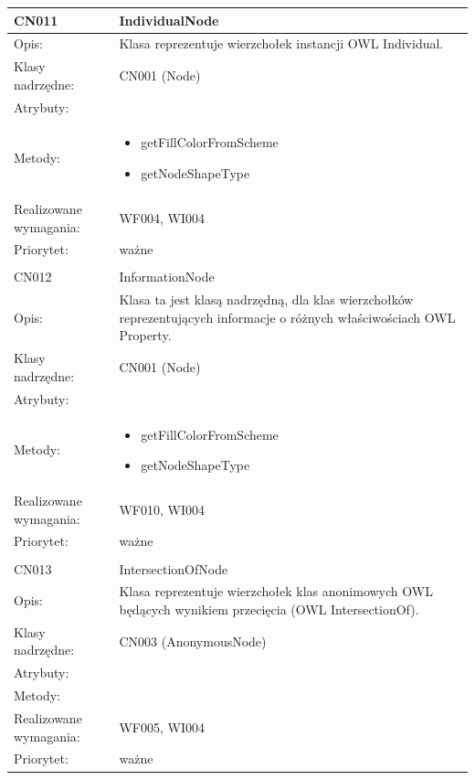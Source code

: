 \documentclass[a4paper,10pt]{article}
\begin{document}
\begin{center}
\begin{longtable}{|m{3cm}|m{9cm}|}
CN011 & IndividualNode \\ \hline
Opis: & Klasa reprezentuje wierzchołek instancji OWL Individual.  \\ \hline
Klasy nadrzędne: & CN001 (Node)       \\ \hline
Atrybuty: & %
 \\ \hline
Metody: & \begin{itemize}
 \item getFillColorFromScheme
 \item getNodeShapeType
\end{itemize}
  \\ \hline
Realizowane wymagania: & WF004, WI004 \\ \hline
Priorytet: & ważne  \\ \hline

\multicolumn{2}{c}{} \\
 \hline

CN012 & InformationNode \\ \hline
Opis: & Klasa ta jest klasą nadrzędną, dla klas wierzchołków reprezentujących informacje o różnych właściwościach OWL Property.    \\ \hline
Klasy nadrzędne: & CN001 (Node)       \\ \hline
Atrybuty: & %
 \\ \hline
Metody: & \begin{itemize}
 \item getFillColorFromScheme
 \item getNodeShapeType
\end{itemize}
  \\ \hline
Realizowane wymagania: & WF010, WI004 \\ \hline
Priorytet: & ważne  \\ \hline

\multicolumn{2}{c}{} \\
 \hline

CN013 & IntersectionOfNode \\ \hline
Opis: & Klasa reprezentuje wierzchołek klas anonimowych OWL będących wynikiem przecięcia (OWL IntersectionOf).    \\ \hline
Klasy nadrzędne: & CN003 (AnonymousNode)     \\ \hline
Atrybuty: & %
 \\ \hline
Metody: & %
  \\ \hline
Realizowane wymagania: & WF005, WI004 \\ \hline
Priorytet: & ważne  \\ \hline


\end{longtable}
\end{center}
\end{document}
